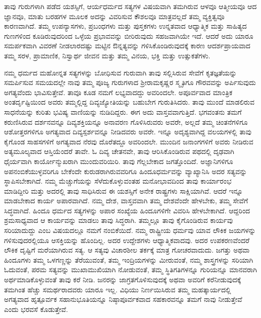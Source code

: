 ತಾವು ಗುರುಗಳಾಗಿ ಪಡೆದ ಯಶಸ್ಸಿಗೆ, ಆರ್ಯಧರ್ಮದ ಸತ್ಯಗಳ ವಿಷಯವಾಗಿ ತಮಗಿರುವ ಆಳವೂ ಆತ್ಮೀಯವೂ ಆದ ಜ್ಞಾನವೂ, ಮಾತು ಬರಹಗಳ ಮೂಲಕ ಅದನ್ನು ವಿವರಿಸುವ ಕೌಶಲವೂ ಮಾತ್ರವಲ್ಲದೆ ತಮ್ಮ ವ್ಯಕ್ತಿತ್ವವೂ ಕಾರಣವಾಗಿದೆ. ತಮ್ಮ ಉಪನ್ಯಾಸಗಳು, ಪ್ರಬಂಧಗಳು ಮತ್ತು ಪುಸ್ತಕಗಳು ಉನ್ನತವಾದ ಆಧ್ಯಾತ್ಮಿಕ ಮತ್ತು ಸಾಹಿತ್ಯದ ಗುಣಗಳಿಂದ ಕೂಡಿರುವುದರಿಂದ ಒಳ್ಳೆಯ ಪ್ರಭಾವವನ್ನು ಬೀರಿರುವುದು ಸಹಜವಾಗಿಯೇ ಇದೆ. ಆದರೆ ಅದು ಯಾರೂ ಸಮರ್ಪಕವಾಗಿ ವಿವರಣೆ ನೀಡಲಾರದಷ್ಟು ಮಟ್ಟಿನ ಔನ್ನತ್ಯವನ್ನು ಗಳಿಸಿಕೊಂಡಿರುವುದಕ್ಕೆ ಕಾರಣ ಆದರ್ಶಪ್ರಾಯವಾದ ತಮ್ಮ ಸರಳ, ಪ್ರಾಮಾಣಿಕ, ನಿಸ್ವಾರ್ಥ ಜೀವನ ಮತ್ತು ತಮ್ಮ ವಿನಯ, ಭಕ್ತಿ ಮತ್ತು ಉತ್ಸುಕತೆಗಳು.

ನಮ್ಮ ಧರ್ಮದ ಮಹೋನ್ನತ ಸತ್ಯಗಳನ್ನು ಬೋಧಿಸುವ ಗುರುವಾಗಿ ತಾವು ಸಲ್ಲಿಸಿರುವ ಸೇವೆಗೆ ಕೃತಜ್ಞತೆಯನ್ನು ಸಮರ್ಪಿಸುವ ಸಮಯದಲ್ಲೇ ನಾವು ತಮ್ಮ ಪೂಜ್ಯ ಗುರುಗಳಾದ ಶ‍್ರೀರಾಮಕೃಷ್ಣರ ಸ್ಮೃತಿಗೂ ಗೌರವವನ್ನು ಅರ್ಪಿಸುವುದು ಅಗತ್ಯವೆಂದು ಭಾವಿಸುತ್ತೇವೆ. ತಾವೂ ಕೂಡ ನಮಗೆ ಲಭ್ಯವಾದದ್ದು ಅವರಿಂದಲೇ. ಅಪೂರ್ವವಾದ ಮಾಂತ್ರಿಕ ಅಂತರ್ದೃಷ್ಟಿಯಿಂದ ಅವರು ತಮ್ಮಲ್ಲಿದ್ದ ದಿವ್ಯಜ್ಯೋತಿಯನ್ನು ಬಹುಬೇಗ ಗುರುತಿಸಿದರು. ತಾವು ಮುಂದೆ ಮಾಡಲಿರುವ ಸಾಧನೆಯನ್ನು ಕುರಿತು ಭವಿಷ್ಯ ವಾಣಿಯನ್ನು ನುಡಿದಿದ್ದರು. ಈಗ ಅದು ವಾಸ್ತವವಾಗುತ್ತಿದೆ. ಭಗವಂತನು ತಮಗೆ ಕರುಣಿಸಿರುವ ದರ್ಶನವನ್ನೂ ದಿವ್ಯಶಕ್ತಿಯನ್ನೂ ಅನಾವರಣ ಗೊಳಿಸಿರುವರು ಅವರೇ, ಅಲ್ಲದೆ ತಮ್ಮ ಚಿಂತನೆಗಳಿಗೂ ಆಶೋತ್ತರಗಳಿಗೂ ಅಗತ್ಯವಾದ ದಿವ್ಯಸ್ಪರ್ಶವನ್ನೂ ನೀಡಿದವರು ಅವರೇ. ಇನ್ನೂ ಅದೃಶ್ಯವಾಗಿದ್ದ ವಲಯಗಳಲ್ಲಿ ತಾವು ಕೈಗೊಂಡ ಸಾಹಸಗಳಿಗೆ ಅಗತ್ಯವಾದ ನೆರವು ದೊರೆತದ್ದೂ ಅವರಿಂದಲೇ. ಮುಂದಿನ ಜನಾಂಗಗಳಿಗೆ ಅವರು ನೀಡಿರುವ ಅತ್ಯಮೂಲ್ಯವಾದ ಆಸ್ತಿಯೆಂದರೆ ತಾವೇ. ಓ ದಿವ್ಯ ಚೇತನವೇ, ತಾವು ಆರಿಸಿಕೊಂಡಿರುವ ಪಥದಲ್ಲಿ ದೃಢವಾಗಿ ಧೈರ್ಯವಾಗಿ ಕಾರ್ಯೋನ್ಮುಖರಾಗಿ ಮುಂದುವರಿಯಿರಿ. ತಾವು ಗೆಲ್ಲಬೇಕಾದ ಜಗತ್ತೊಂದಿದೆ. ಅಜ್ಞಾನಿಗಳಿಗೂ ಅಪನಂಬಿಕೆಯುಳ್ಳವರಿಗೂ ಬೇಕೆಂದೇ ಕುರುಡರಾಗಿರುವವರಿಗೂ ಹಿಂದೂಧರ್ಮವನ್ನು ವ್ಯಾಖ್ಯಾನಿಸಿ ಅದರ ಸತ್ಯವನ್ನು ಸ್ಥಾಪಿಸಬೇಕಾಗಿದೆ. ನಮ್ಮ ಮೆಚ್ಚುಗೆಯನ್ನು ಸೆಳೆದುಕೊಳ್ಳುವಂತಹ ಮನೋಭಾವದಿಂದ ತಾವು ಕಾರ್ಯಾರಂಭ ಮಾಡಿದ್ದೀರಿ ಮತ್ತು ಅದರಲ್ಲಿ ತಾವು ಸಾಧಿಸಿರುವ ಈ ಯಶಸ್ಸಿಗೆ ಅನೇಕ ರಾಷ್ಟ್ರಗಳು ಸಾಕ್ಷಿಯಾಗಿವೆ. ಆದರೆ ಇನ್ನೂ ಮಾಡಬೇಕಾದ ಕಾರ್ಯ ಅಪಾರವಾಗಿದೆ. ನಮ್ಮ ದೇಶ, ವಾಸ್ತವವಾಗಿ ತಮ್ಮ ದೇಶವೆಂದೇ ಹೇಳಬೇಕು, ತಮ್ಮ ಸೇವೆಗೆ ಸಿದ್ಧವಾಗಿದೆ. ಹಿಂದೂ ಧರ್ಮದ ಸತ್ಯಗಳನ್ನು ಅಪಾರ ಸಂಖ್ಯೆಯ ಹಿಂದೂಗಳಿಗೇ ವಿವರಿಸಿ ಹೇಳಬೇಕಾಗಿದೆ. ಆದ್ದರಿಂದ ಶ್ರಮಸಾಧ್ಯವಾದ ಆ ಕಾರ್ಯವನ್ನು ಮಾಡಲು ತಾವು ಸಿದ್ಧರಾಗಿ. ತಮ್ಮಲ್ಲೂ ತಾವು ಕೈಗೊಂಡಿರುವ ಕಾರ್ಯವು ಸರಿಯಾದುದ್ದು ಎಂಬ ವಿಷಯದಲ್ಲೂ ನಮಗೆ ನಂಬಿಕೆಯಿದೆ. ನಮ್ಮ ರಾಷ್ಟ್ರೀಯ ಧರ್ಮವು ಯಾವ ಲೌಕಿಕ ಜಯಗಳನ್ನು ಗಳಿಸುವುದರಲ್ಲಿಯೂ ಆಸಕ್ತಿಯನ್ನು ಹೊಂದಿಲ್ಲ. ಅದರ ಉದ್ದೇಶಗಳು ಆಧ್ಯಾತ್ಮಿಕವಾದವು. ಅದರ ಉಪಕರಣವೆಂದರೆ ಲೌಕಿಕ ದೃಷ್ಟಿಗೆ ಮರೆಯಾಗಿರುವ ಸತ್ಯ. ಆ ಸತ್ಯವು ವಿಚಾರಶೀಲ ತರ್ಕಕ್ಕೆ ಮಾತ್ರ ಗೋಚರವಾದುದು. ಜಗತ್ತು ಅಥವಾ ಹಿಂದೂಗಳು ತಮ್ಮ ಒಳಗಣ್ಣನ್ನು ತೆರೆಯುವಂತೆ, ತಮ್ಮ ಇಂದ್ರಿಯಗಳನ್ನು ಮೀರುವಂತೆ, ನಮ್ಮ ಶಾಸ್ತ್ರಗಳನ್ನು ಸರಿಯಾಗಿ ಓದುವಂತೆ, ಪರಮ ಸತ್ಯವನ್ನು ಮುಖಾಮುಖಿಯಾಗಿ ನೋಡುವಂತೆ, ತಮ್ಮ ಸ್ಥಿತಿಗತಿಗಳನ್ನೂ ಗುರಿಯನ್ನೂ ಮಾನವರಾಗಿ ಅರ್ಥಮಾಡಿಕೊಳ್ಳುವಂತೆ ತಾವು ಕರೆ ನೀಡಿ. ಜನರನ್ನು ಜಾಗ್ರತಗೊಳಿಸುವುದಕ್ಕೆ ಅಥವಾ ಅವರಿಗೆ ಕರೆನೀಡುವುದಕ್ಕೆ ತಮಗಿಂತ ಹೆಚ್ಚು ಸಮರ್ಥರಾದವರು ಯಾರೂ ಇಲ್ಲ. ವಿಧಿಯು ನಿರ್ಣಯಿಸಿರುವ ತಮ್ಮ ಮಹತ್ಕಾರ್ಯದಲ್ಲಿ ಅಗತ್ಯವಾದ ಹೃತ್ಪೂರ್ವಕ ಸಹಾನುಭೂತಿಯನ್ನೂ ನಿಷ್ಠಾಪೂರ್ವಕವಾದ ಸಹಕಾರವನ್ನೂ ತಮಗೆ ನಾವು ನೀಡುತ್ತೇವೆ ಎಂದು ಭರವಸೆ ಕೊಡುತ್ತೇವೆ.

